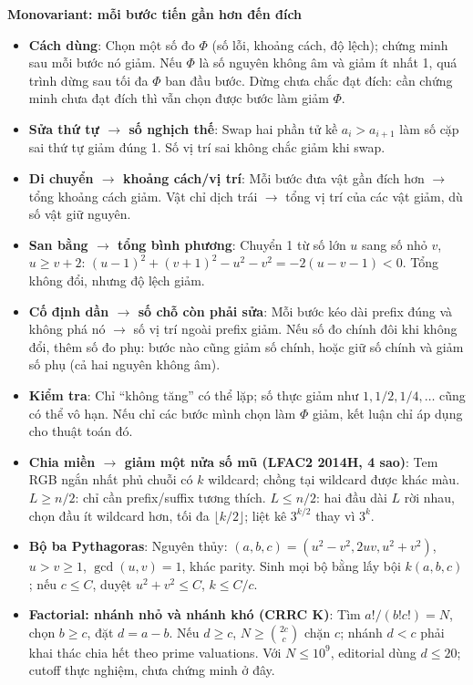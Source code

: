 \noindent\textbf{Monovariant: mỗi bước tiến gần hơn đến đích}
\begin{itemize}
    \setlength{\itemsep}{0pt}
    \setlength{\parsep}{0pt}
    \item \textbf{Cách dùng}: Chọn một số đo $\Phi$ (số lỗi, khoảng cách, độ lệch); chứng minh sau mỗi bước nó giảm. Nếu $\Phi$ là số nguyên không âm và giảm ít nhất 1, quá trình dừng sau tối đa $\Phi$ ban đầu bước. Dừng chưa chắc đạt đích: cần chứng minh chưa đạt đích thì vẫn chọn được bước làm giảm $\Phi$.
    \item \textbf{Sửa thứ tự $\to$ số nghịch thế}: Swap hai phần tử kề $a_i>a_{i+1}$ làm số cặp sai thứ tự giảm đúng 1. Số vị trí sai không chắc giảm khi swap.
    \item \textbf{Di chuyển $\to$ khoảng cách/vị trí}: Mỗi bước đưa vật gần đích hơn $\to$ tổng khoảng cách giảm. Vật chỉ dịch trái $\to$ tổng vị trí của các vật giảm, dù số vật giữ nguyên.
    \item \textbf{San bằng $\to$ tổng bình phương}: Chuyển 1 từ số lớn $u$ sang số nhỏ $v$, $u\ge v+2$: $(u-1)^2+(v+1)^2-u^2-v^2=-2(u-v-1)<0$. Tổng không đổi, nhưng độ lệch giảm.
    \item \textbf{Cố định dần $\to$ số chỗ còn phải sửa}: Mỗi bước kéo dài prefix đúng và không phá nó $\to$ số vị trí ngoài prefix giảm. Nếu số đo chính đôi khi không đổi, thêm số đo phụ: bước nào cũng giảm số chính, hoặc giữ số chính và giảm số phụ (cả hai nguyên không âm).
    \item \textbf{Kiểm tra}: Chỉ ``không tăng'' có thể lặp; số thực giảm như $1,1/2,1/4,\ldots$ cũng có thể vô hạn. Nếu chỉ các bước mình chọn làm $\Phi$ giảm, kết luận chỉ áp dụng cho thuật toán đó.
\end{itemize}


\begin{itemize}
    \setlength{\itemsep}{0pt}
    \setlength{\parsep}{0pt}
    \item \textbf{Chia miền $\to$ giảm một nửa số mũ (LFAC2 2014H, 4 sao)}: Tem RGB ngắn nhất phủ chuỗi có $k$ wildcard; chồng tại wildcard được khác màu. $L\ge n/2$: chỉ cần prefix/suffix tương thích. $L\le n/2$: hai đầu dài $L$ rời nhau, chọn đầu ít wildcard hơn, tối đa $\lfloor k/2\rfloor$; liệt kê $3^{k/2}$ thay vì $3^k$.

    \item \textbf{Bộ ba Pythagoras}: Nguyên thủy: $(a,b,c)=(u^2-v^2,2uv,u^2+v^2)$, $u>v\ge1$, $\gcd(u,v)=1$, khác parity. Sinh mọi bộ bằng lấy bội $k(a,b,c)$; nếu $c\le C$, duyệt $u^2+v^2\le C$, $k\le C/c$.

    \item \textbf{Factorial: nhánh nhỏ và nhánh khó (CRRC K)}: Tìm $a!/(b!c!)=N$, chọn $b\ge c$, đặt $d=a-b$. Nếu $d\ge c$, $N\ge\binom{2c}{c}$ chặn $c$; nhánh $d<c$ phải khai thác chia hết theo prime valuations. Với $N\le10^9$, editorial dùng $d\le20$; cutoff thực nghiệm, chưa chứng minh ở đây.
\end{itemize}
